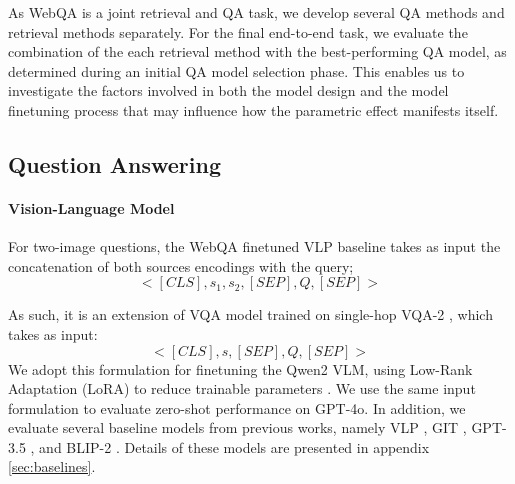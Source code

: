 As WebQA is a joint retrieval and QA task, we develop several QA methods and retrieval methods separately. For the final end-to-end task, we evaluate the combination of the each retrieval method with the best-performing QA model, as determined during an initial QA model selection phase. This enables us to investigate the factors involved in both the model design and the model finetuning process that may influence how the parametric effect manifests itself.


\subsection{Question Answering}

\paragraph{Vision-Language Model}
For two-image questions, the WebQA finetuned VLP baseline \citep{zhou_unified_2020} takes as input the concatenation of both sources encodings with the query; 
\begin{equation}
<[CLS], s_1, s_2, [SEP], Q, [SEP]>
\end{equation}

As such, it is an extension of VQA model trained on single-hop VQA-2 \citep{yu_unified_2023}, which takes as input:
\begin{equation}
<[CLS], s, [SEP], Q, [SEP]>
\end{equation}
We adopt this formulation for finetuning the Qwen2 VLM, using Low-Rank Adaptation (LoRA) to reduce trainable parameters \cite{hu2021lora}. We use the same input formulation to evaluate zero-shot performance on GPT-4o. In addition, we evaluate several baseline models from previous works, namely VLP \citep{zhou_unified_2020}, GIT \citep{wang2022git}, GPT-3.5 \citep{brown2020language}, and BLIP-2 \citep{li2022blip}. Details of these models are presented in appendix \autoref{sec:baselines}.


